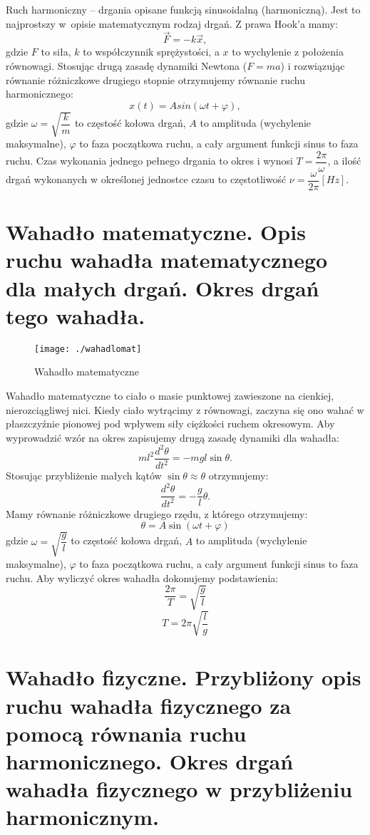 \documentclass[a4paper,11pt]{article}
\begin{document}
Ruch harmoniczny -- drgania opisane funkcją sinusoidalną (harmoniczną). Jest to najprostszy w~opisie matematycznym rodzaj drgań. Z prawa Hook'a mamy:
$$\vec{F}=-k\vec{x},$$
gdzie $F$ to siła, $k$ to współczynnik sprężystości, a $x$ to wychylenie z położenia równowagi.
Stosując drugą zasadę dynamiki Newtona ($F = ma$) i rozwiązując równanie różniczkowe drugiego stopnie otrzymujemy równanie ruchu harmonicznego: 
$$x(t)=Asin(\omega t +\varphi),$$
gdzie $\omega=\sqrt{\dfrac{k}{m}}$ to częstość kołowa drgań, $A$ to amplituda (wychylenie maksymalne), $\varphi$ to faza początkowa ruchu, a cały argument funkcji sinus to faza ruchu.
Czas wykonania jednego pełnego drgania to okres i wynosi $T=\dfrac{2\pi}{\omega}$, a ilość drgań wykonanych w określonej jednostce czasu
to częstotliwość $\nu=\dfrac{\omega}{2\pi}[Hz]$.

\section{Wahadło matematyczne. Opis ruchu wahadła matematycznego dla małych drgań. Okres drgań tego wahadła.}
\begin{wrapfigure}{l}{0.4\textwidth}
\texttt{[image: ./wahadlomat]}
\caption{Wahadło matematyczne}
\end{wrapfigure}
Wahadło matematyczne to ciało o masie punktowej zawieszone na cienkiej, nierozciągliwej nici. Kiedy ciało wytrącimy z równowagi, zaczyna się ono wahać w płaszczyźnie pionowej pod wpływem siły ciężkości ruchem okresowym.
Aby wyprowadzić wzór na okres zapisujemy drugą zasadę dynamiki dla wahadła:
$$ml^{2} \frac{d^{2} \theta }{dt^{2}}=-mgl\sin \theta.$$
Stosując przybliżenie małych kątów $\sin \theta \approx \theta$ otrzymujemy:
$$\frac{d^{2} \theta }{dt^{2}}=- \frac{g}{l} \theta.$$
Mamy równanie różniczkowe drugiego rzędu, z którego otrzymujemy:
$$\theta =A\sin (\omega t + \varphi)$$ 
gdzie $\omega = \sqrt{ \dfrac{g}{l} }$ to częstość kołowa drgań, $A$ to amplituda (wychylenie maksymalne), $\varphi$ to faza początkowa ruchu, a cały argument funkcji sinus to faza ruchu.
Aby wyliczyć okres wahadła dokonujemy podstawienia:
$$\frac{2\pi}{T}= \sqrt{\frac{g}{l}}$$
$$T=2\pi\sqrt{\dfrac{l}{g}}$$
$$$$
\section{Wahadło fizyczne. Przybliżony opis ruchu wahadła fizycznego za pomocą równania ruchu harmonicznego. Okres drgań wahadła fizycznego w przybliżeniu harmonicznym.} 
\end{document}
